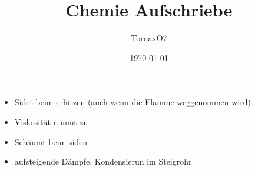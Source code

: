 \documentclass[a4paper, 12pt]{scrartcl}
\title{Chemie Aufschriebe}
\author{TornaxO7}
\date{\today}
\begin{document}
\begin{itemize}
    \item Sidet beim erhitzen (auch wenn die Flamme weggenommen wird)
    \item Viskosität nimmt zu
    \item Schäumt beim siden
    \item aufsteigende Dämpfe, Kondensierun im Steigrohr
\end{itemize}
\end{document}
